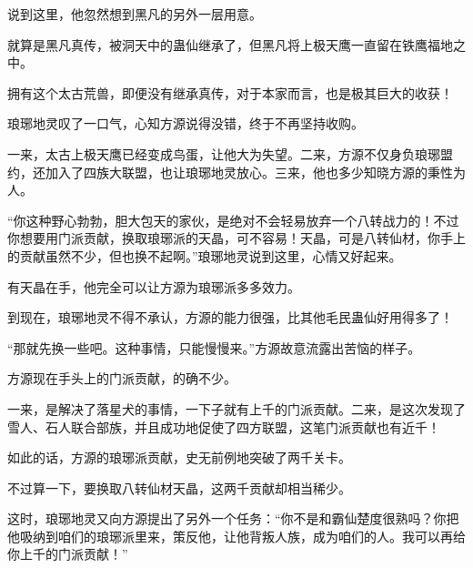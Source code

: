 \begin{this_body}
说到这里，他忽然想到黑凡的另外一层用意。

就算是黑凡真传，被洞天中的蛊仙继承了，但黑凡将上极天鹰一直留在铁鹰福地之中。

拥有这个太古荒兽，即便没有继承真传，对于本家而言，也是极其巨大的收获！

琅琊地灵叹了一口气，心知方源说得没错，终于不再坚持收购。

一来，太古上极天鹰已经变成鸟蛋，让他大为失望。二来，方源不仅身负琅琊盟约，还加入了四族大联盟，也让琅琊地灵放心。三来，他也多少知晓方源的秉性为人。

“你这种野心勃勃，胆大包天的家伙，是绝对不会轻易放弃一个八转战力的！不过你想要用门派贡献，换取琅琊派的天晶，可不容易！天晶，可是八转仙材，你手上的贡献虽然不少，但也换不起啊。”琅琊地灵说到这里，心情又好起来。

有天晶在手，他完全可以让方源为琅琊派多多效力。

到现在，琅琊地灵不得不承认，方源的能力很强，比其他毛民蛊仙好用得多了！

“那就先换一些吧。这种事情，只能慢慢来。”方源故意流露出苦恼的样子。

方源现在手头上的门派贡献，的确不少。

一来，是解决了落星犬的事情，一下子就有上千的门派贡献。二来，是这次发现了雪人、石人联合部族，并且成功地促使了四方联盟，这笔门派贡献也有近千！

如此的话，方源的琅琊派贡献，史无前例地突破了两千关卡。

不过算一下，要换取八转仙材天晶，这两千贡献却相当稀少。

这时，琅琊地灵又向方源提出了另外一个任务：“你不是和霸仙楚度很熟吗？你把他吸纳到咱们的琅琊派里来，策反他，让他背叛人族，成为咱们的人。我可以再给你上千的门派贡献！”

\end{this_body}

